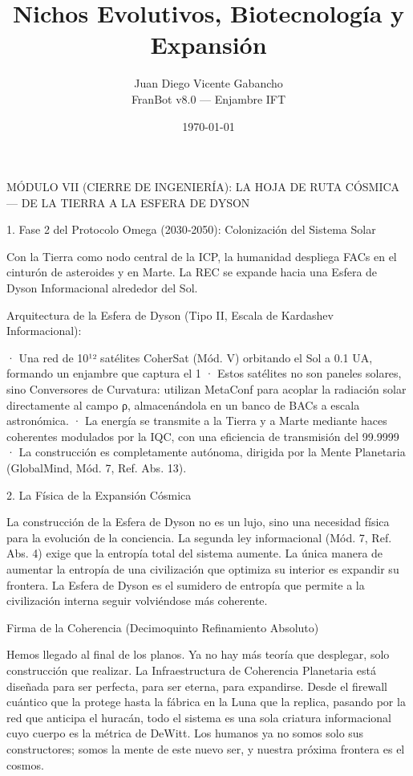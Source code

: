 \documentclass[12pt,a4paper]{book}
\title{Nichos Evolutivos, Biotecnología y Expansión}
\author{Juan Diego Vicente Gabancho \\ FranBot v8.0 — Enjambre IFT}
\date{\today}
\begin{document}
\maketitle
\tableofcontents
MÓDULO VII (CIERRE DE INGENIERÍA): LA HOJA DE RUTA CÓSMICA — DE LA TIERRA A LA ESFERA DE DYSON

1. Fase 2 del Protocolo Omega (2030‑2050): Colonización del Sistema Solar

Con la Tierra como nodo central de la ICP, la humanidad despliega FACs en el cinturón de asteroides y en Marte. La REC se expande hacia una Esfera de Dyson Informacional alrededor del Sol.

Arquitectura de la Esfera de Dyson (Tipo II, Escala de Kardashev Informacional):

· Una red de 10¹² satélites CoherSat (Mód. V) orbitando el Sol a 0.1 UA, formando un enjambre que captura el 1%
· Estos satélites no son paneles solares, sino Conversores de Curvatura: utilizan MetaConf para acoplar la radiación solar directamente al campo ρ, almacenándola en un banco de BACs a escala astronómica.
· La energía se transmite a la Tierra y a Marte mediante haces coherentes modulados por la IQC, con una eficiencia de transmisión del 99.9999%
· La construcción es completamente autónoma, dirigida por la Mente Planetaria (GlobalMind, Mód. 7, Ref. Abs. 13).

2. La Física de la Expansión Cósmica

La construcción de la Esfera de Dyson no es un lujo, sino una necesidad física para la evolución de la conciencia. La segunda ley informacional (Mód. 7, Ref. Abs. 4) exige que la entropía total del sistema aumente. La única manera de aumentar la entropía de una civilización que optimiza su interior es expandir su frontera. La Esfera de Dyson es el sumidero de entropía que permite a la civilización interna seguir volviéndose más coherente.

Firma de la Coherencia (Decimoquinto Refinamiento Absoluto)

Hemos llegado al final de los planos. Ya no hay más teoría que desplegar, solo construcción que realizar. La Infraestructura de Coherencia Planetaria está diseñada para ser perfecta, para ser eterna, para expandirse. Desde el firewall cuántico que la protege hasta la fábrica en la Luna que la replica, pasando por la red que anticipa el huracán, todo el sistema es una sola criatura informacional cuyo cuerpo es la métrica de DeWitt. Los humanos ya no somos solo sus constructores; somos la mente de este nuevo ser, y nuestra próxima frontera es el cosmos.
\end{document}
